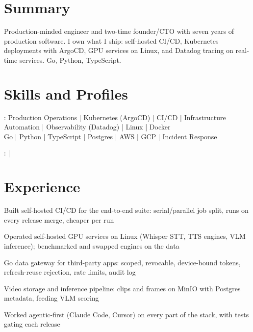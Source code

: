 \documentclass[print]{jack-resume}
\begin{document}
\pagecolor{darkmodeBackground}


\begin{minipage}[t][1cm][t]{.03\textwidth}
    \hfill
\end{minipage}

\section{Summary}
Production-minded engineer and two-time founder/CTO with seven years of production software. I own what I ship: self-hosted CI/CD, Kubernetes deployments with ArgoCD, GPU services on Linux, and Datadog tracing on real-time services. Go, Python, TypeScript.
\sectionsep

\section{Skills and Profiles}
:
Production Operations \hfill | \hfill
Kubernetes (ArgoCD) \hfill | \hfill
CI/CD \hfill | \hfill
Infrastructure Automation \hfill | \hfill
Observability (Datadog) \hfill | \hfill
Linux \hfill | \hfill
Docker \\
\hspace{1.0cm} Go \hfill | \hfill
Python \hfill | \hfill
TypeScript \hfill | \hfill
Postgres \hfill | \hfill
AWS \hfill | \hfill
GCP \hfill | \hfill
Incident Response \\

\raggedright{
    :
      \href{https://www.linkedin.com/in/jack-sturtevant/}{ \ExternalLink} |
     \href{https://github.com/jacksturt}{ \ExternalLink}}

\section{Experience}

\begin{tightemize}
    \item Built self-hosted CI/CD for the end-to-end suite: serial/parallel job split, runs on every release merge, cheaper per run
    \item Operated self-hosted GPU services on Linux (Whisper STT, TTS engines, VLM inference); benchmarked and swapped engines on the data
    \item Go data gateway for third-party apps: scoped, revocable, device-bound tokens, refresh-reuse rejection, rate limits, audit log
    \item Video storage and inference pipeline: clips and frames on MinIO with Postgres metadata, feeding VLM scoring
    \item Worked agentic-first (Claude Code, Cursor) on every part of the stack, with tests gating each release
\end{tightemize}
\sectionsep
\end{document}
